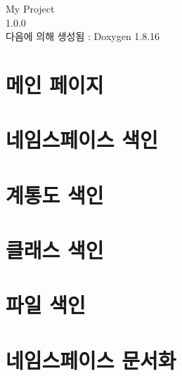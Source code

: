 \let\mypdfximage\pdfximage\def\pdfximage{\immediate\mypdfximage}\documentclass[twoside]{book}
\newcommand{\+}{\discretionary{\mbox{\scriptsize$\hookleftarrow$}}{}{}}
\newcommand{\clearemptydoublepage}{%
  \newpage{\pagestyle{empty}\cleardoublepage}%
}
\begin{document}
\hypersetup{pageanchor=false,
             bookmarksnumbered=true,
             pdfencoding=unicode
            }
\begin{titlepage}
\vspace*{7cm}
\begin{center}%
{\Large My Project \\[1ex]\large 1.\+0.\+0 }\\
\vspace*{1cm}
{\large 다음에 의해 생성됨 \+:  Doxygen 1.8.16}\\
\end{center}
\end{titlepage}
\clearemptydoublepage
{}
\tableofcontents
\clearemptydoublepage
{}
\hypersetup{pageanchor=true}

\chapter{메인 페이지}
\label{index}\hypertarget{index}{}
\chapter{네임스페이스 색인}

\chapter{계통도 색인}

\chapter{클래스 색인}

\chapter{파일 색인}

\chapter{네임스페이스 문서화}






\end{document}
